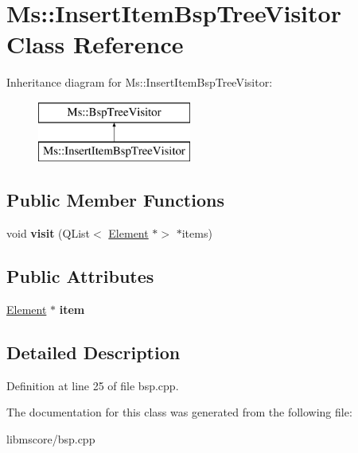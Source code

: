 \hypertarget{class_ms_1_1_insert_item_bsp_tree_visitor}{}\section{Ms\+:\+:Insert\+Item\+Bsp\+Tree\+Visitor Class Reference}
\label{class_ms_1_1_insert_item_bsp_tree_visitor}
Inheritance diagram for Ms\+:\+:Insert\+Item\+Bsp\+Tree\+Visitor\+:\begin{figure}[H]
\begin{center}
\leavevmode
\includegraphics[height=2.000000cm]{class_ms_1_1_insert_item_bsp_tree_visitor}
\end{center}
\end{figure}
\subsection*{Public Member Functions}
\begin{DoxyCompactItemize}
\item 
\mbox{\label{class_ms_1_1_insert_item_bsp_tree_visitor_a61eb30948dd0f164782fa60668d5c4b0}} 
void {\bfseries visit} (Q\+List$<$ \hyperlink{class_ms_1_1_element}{Element} $\ast$$>$ $\ast$items)
\end{DoxyCompactItemize}
\subsection*{Public Attributes}
\begin{DoxyCompactItemize}
\item 
\mbox{\label{class_ms_1_1_insert_item_bsp_tree_visitor_ac40554e7e4f384694511854da02b8c80}} 
\hyperlink{class_ms_1_1_element}{Element} $\ast$ {\bfseries item}
\end{DoxyCompactItemize}


\subsection{Detailed Description}


Definition at line 25 of file bsp.\+cpp.



The documentation for this class was generated from the following file\+:\begin{DoxyCompactItemize}
\item 
libmscore/bsp.\+cpp\end{DoxyCompactItemize}
